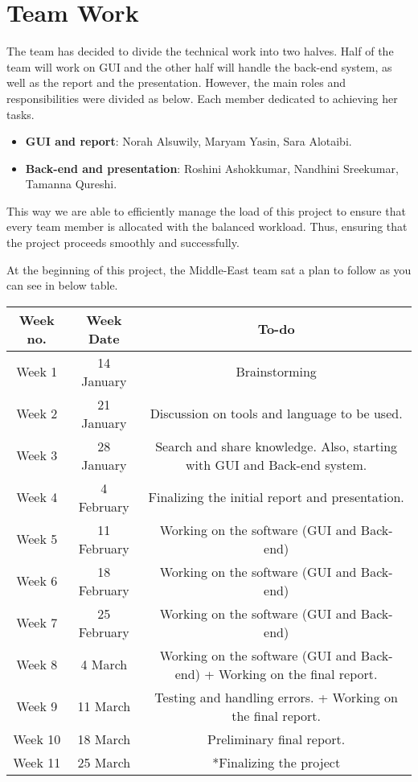 \documentclass{article}
\begin{document}
 \newpage



\section{Team Work}
The team has decided to divide the technical work into two halves. Half of the team will work on GUI and the other half will handle the back-end system, as well as the report and the presentation. However,  the main roles and responsibilities were divided as below. Each member dedicated to achieving her tasks.
\begin{itemize}

\item \textbf{GUI and report}: Norah Alsuwily, Maryam Yasin, Sara Alotaibi. 
\item \textbf{Back-end and presentation}: Roshini Ashokkumar, Nandhini Sreekumar, Tamanna Qureshi. 
\end{itemize}
This way we are able to efficiently manage the load of this project to ensure that every team member is allocated with the balanced workload. Thus, ensuring that the project proceeds smoothly and successfully.



At the beginning of this project, the Middle-East team sat a plan to follow as you can see in below table. 

\begin{center}
\begin{tabular}{ |c|c|c|} 
\hline
\textbf{Week no.} & \textbf{Week Date } & \textbf{To-do } \\ 
\hline
Week 1 & 14 January  & Brainstorming \\ 
\hline
Week 2 & 21 January  & Discussion  on tools and language to be used. \\ 
\hline

Week 3 & 28 January & Search and share knowledge. 
 Also, starting with GUI and Back-end system. 
 \\ 
\hline
Week 4 & 4 February & Finalizing the initial report and presentation.  \\ 
\hline
Week 5 &  11 February & Working on the software (GUI and Back-end)  \\
\hline
Week 6 & 18  February & Working on the software (GUI and Back-end)   \\ 
\hline
Week 7 & 25  February & Working on the software (GUI and Back-end)   \\ 
\hline
Week 8 & 4 March  & Working on the software (GUI and Back-end) + Working on the final report.   \\ 
\hline
Week 9 & 11 March  & Testing and handling errors. + Working on the final report.   \\ 
\hline
Week 10 & 18 March  & Preliminary final report. \\ 
\hline
Week 11 & 25 March  & *Finalizing the project  \\ 

\hline

\end{tabular}
\end{center}
\end{document}
